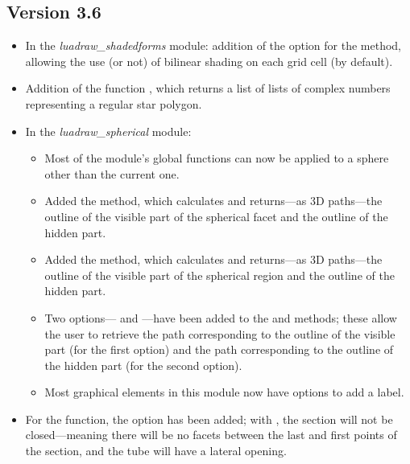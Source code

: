 \subsection{Version 3.6}
\begin{itemize}
    \item In the \emph{luadraw\_shadedforms} module: addition of the  option for the  method, allowing the use (or not) of bilinear shading on each grid cell (\true by default).

    \item Addition of the function , which returns a list of lists of complex numbers representing a regular star polygon.

    \item In the \emph{luadraw\_spherical} module:
    \begin{itemize}
        \item Most of the module's global functions can now be applied to a sphere other than the current one. 
        
        \item Added the  method, which calculates and returns—as 3D paths—the outline of the visible part of the spherical facet and the outline of the hidden part.
         
        \item Added the  method, which calculates and returns—as 3D paths—the outline of the visible part of the spherical region and the outline of the hidden part. 
        
        \item Two options— and —have been added to the  and  methods; these allow the user to retrieve the path corresponding to the outline of the visible part (for the first option) and the path corresponding to the outline of the hidden part (for the second option).
        
        \item Most graphical elements in this module now have options to add a label.
    \end{itemize}

    \item For the  function, the  option has been added; with \true, the section will not be closed—meaning there will be no facets between the last and first points of the section, and the tube will have a lateral opening.


\end{itemize}
